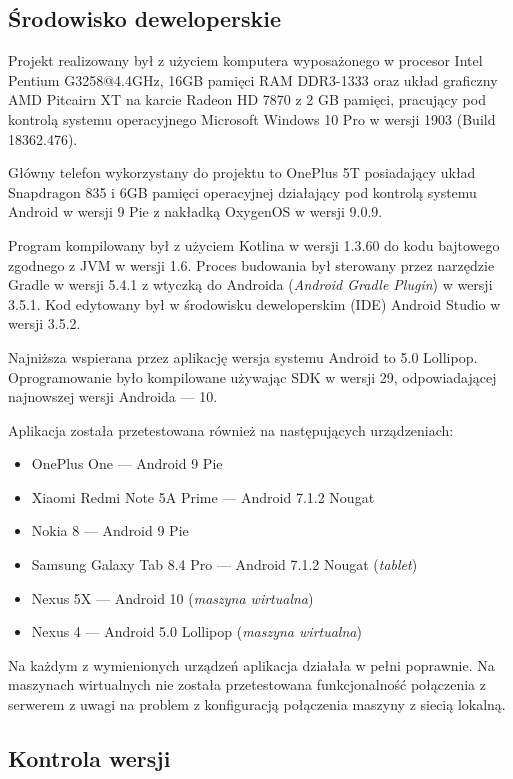 \documentclass[polish,polish,a4paper,12pt]{article}
\begin{document}
	\subsection{Środowisko deweloperskie}

	Projekt realizowany był z użyciem komputera wyposażonego w procesor Intel Pentium G3258@4.4GHz, 16GB pamięci RAM DDR3-1333 oraz układ graficzny AMD Pitcairn XT na karcie Radeon HD 7870 z 2 GB pamięci, pracujący pod kontrolą systemu operacyjnego Microsoft Windows 10 Pro w wersji 1903 (Build 18362.476).

	Główny telefon wykorzystany do projektu to OnePlus 5T posiadający układ Snapdragon 835 i 6GB pamięci operacyjnej działający pod kontrolą systemu Android w wersji 9 Pie z nakładką OxygenOS w wersji 9.0.9.

	Program kompilowany był z użyciem Kotlina w wersji 1.3.60 do kodu bajtowego zgodnego z JVM w wersji 1.6. Proces budowania był sterowany przez narzędzie Gradle w wersji 5.4.1 z wtyczką do Androida (\textit{Android Gradle Plugin}) w wersji 3.5.1. Kod edytowany był w środowisku deweloperskim (IDE) Android Studio w wersji 3.5.2.

	Najniższa wspierana przez aplikację wersja systemu Android to 5.0 Lollipop. Oprogramowanie było kompilowane używając SDK w wersji 29, odpowiadającej najnowszej wersji Androida — 10.

	Aplikacja została przetestowana również na następujących urządzeniach:

	\begin{itemize}
		\item OnePlus One — Android 9 Pie
		\item Xiaomi Redmi Note 5A Prime — Android 7.1.2 Nougat
		\item Nokia 8 — Android 9 Pie
		\item Samsung Galaxy Tab 8.4 Pro — Android 7.1.2 Nougat (\textit{tablet})
		\item Nexus 5X — Android 10 (\textit{maszyna wirtualna})
		\item Nexus 4 — Android 5.0 Lollipop (\textit{maszyna wirtualna})
	\end{itemize}

	Na każdym z wymienionych urządzeń aplikacja działała w pełni poprawnie. Na maszynach wirtualnych nie została przetestowana funkcjonalność połączenia z serwerem z uwagi na problem z konfiguracją połączenia maszyny z siecią lokalną.

	\subsection{Kontrola wersji}
\end{document}
